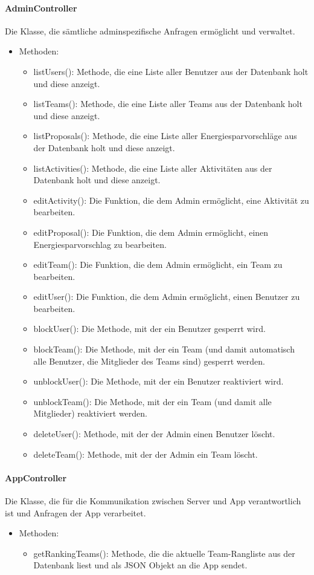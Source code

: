 	\paragraph{AdminController}Die Klasse, die s\"amtliche adminspezifische Anfragen erm\"oglicht und verwaltet.
		\begin{itemize}
			\item Methoden:
			\begin{itemize}
				\item listUsers(): Methode, die eine Liste aller Benutzer aus der Datenbank holt und diese anzeigt.
				\item listTeams(): Methode, die eine Liste aller Teams aus der Datenbank holt und diese anzeigt.
				\item listProposals(): Methode, die eine Liste aller Energiesparvorschl\"age aus der Datenbank holt und diese anzeigt.
				\item listActivities(): Methode, die eine Liste aller Aktivit\"aten aus der Datenbank holt und diese anzeigt.
				\item editActivity(): Die Funktion, die dem Admin erm\"oglicht, eine Aktivit\"at zu bearbeiten.
				\item editProposal(): Die Funktion, die dem Admin erm\"oglicht, einen Energiesparvorschlag zu bearbeiten.
				\item editTeam(): Die Funktion, die dem Admin erm\"oglicht, ein Team zu bearbeiten.
				\item editUser(): Die Funktion, die dem Admin erm\"oglicht, einen Benutzer zu bearbeiten.
				\item blockUser(): Die Methode, mit der ein Benutzer gesperrt wird.
				\item blockTeam(): Die Methode, mit der ein Team (und damit automatisch alle Benutzer, die Mitglieder des Teams sind) gesperrt werden.
				\item unblockUser(): Die Methode, mit der ein Benutzer reaktiviert wird.
				\item unblockTeam(): Die Methode, mit der ein Team (und damit alle Mitglieder) reaktiviert werden.
				\item deleteUser(): Methode, mit der der Admin einen Benutzer l\"oscht.
				\item deleteTeam(): Methode, mit der der Admin ein Team l\"oscht.
			\end{itemize}
		\end{itemize}
	\paragraph{AppController}Die Klasse, die f\"ur die Kommunikation zwischen Server und App verantwortlich ist und Anfragen der App verarbeitet.
		\begin{itemize}
			\item Methoden: %
			\begin{itemize}
				\item getRankingTeams(): Methode, die die aktuelle Team-Rangliste aus der Datenbank liest und als JSON Objekt an die App sendet.
			\end{itemize}
		\end{itemize}
